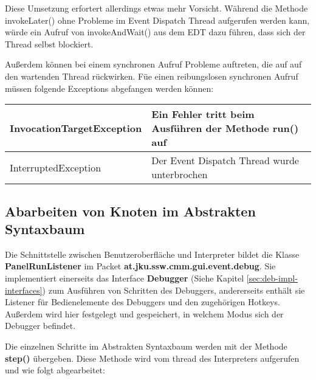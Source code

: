 \begin{enumerate}
\begin{enumerate}
	Diese Umsetzung erfortert allerdings etwas mehr Vorsicht. Während die Methode invokeLater() ohne Probleme im Event Dispatch Thread aufgerufen werden kann, würde ein Aufruf von invokeAndWait() aus dem EDT dazu führen, dass sich der Thread selbst blockiert.
	
	Außerdem können bei einem synchronen Aufruf Probleme auftreten, die auf auf den wartenden Thread rückwirken. Füe einen reibungslosen synchronen Aufruf müssen folgende Exceptions abgefangen werden können:

\def\arraystretch{2.1}
\begin{tabular}{|l|l|}
	\hline
	InvocationTargetException & \parbox{7cm}{Ein Fehler tritt beim Ausführen der Methode run() auf}\\
	\hline
	InterruptedException & \parbox{7cm}{Der Event Dispatch Thread wurde unterbrochen}\\
	\hline
\end{tabular}
\end{enumerate}
\end{enumerate}



\subsection{Abarbeiten von Knoten im Abstrakten Syntaxbaum}
Die Schnittstelle zwischen Benutzeroberfläche und Interpreter bildet die Klasse \textbf{PanelRunListener} im Packet \textbf{at.jku.ssw.cmm.gui.event.debug}. Sie implementiert einerseits das Interface \textbf{Debugger} (Siehe Kapitel \ref{sec:deb-impl-interfaces}) zum Ausführen von Schritten des Debuggers, andererseits enthält sie Listener für Bedienelemente des Debuggers und den zugehörigen Hotkeys. Außerdem wird hier festgelegt und gespeichert, in welchem Modus sich der Debugger befindet.

Die einzelnen Schritte im Abstrakten Syntaxbaum werden mit der Methode \textbf{step()} übergeben. Diese Methode wird vom thread des Interpreters aufgerufen und wie folgt abgearbeitet:


